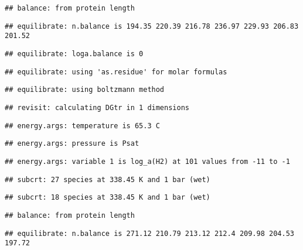 \documentclass[]{article}
\begin{document}
\begin{verbatim}
## balance: from protein length
\end{verbatim}

\begin{verbatim}
## equilibrate: n.balance is 194.35 220.39 216.78 236.97 229.93 206.83 201.52
\end{verbatim}

\begin{verbatim}
## equilibrate: loga.balance is 0
\end{verbatim}

\begin{verbatim}
## equilibrate: using 'as.residue' for molar formulas
\end{verbatim}

\begin{verbatim}
## equilibrate: using boltzmann method
\end{verbatim}

\begin{verbatim}
## revisit: calculating DGtr in 1 dimensions
\end{verbatim}

\begin{verbatim}
## energy.args: temperature is 65.3 C
\end{verbatim}

\begin{verbatim}
## energy.args: pressure is Psat
\end{verbatim}

\begin{verbatim}
## energy.args: variable 1 is log_a(H2) at 101 values from -11 to -1
\end{verbatim}

\begin{verbatim}
## subcrt: 27 species at 338.45 K and 1 bar (wet)
\end{verbatim}

\begin{verbatim}
## subcrt: 18 species at 338.45 K and 1 bar (wet)
\end{verbatim}

\begin{verbatim}
## balance: from protein length
\end{verbatim}

\begin{verbatim}
## equilibrate: n.balance is 271.12 210.79 213.12 212.4 209.98 204.53 197.72
\end{verbatim}
\end{document}
